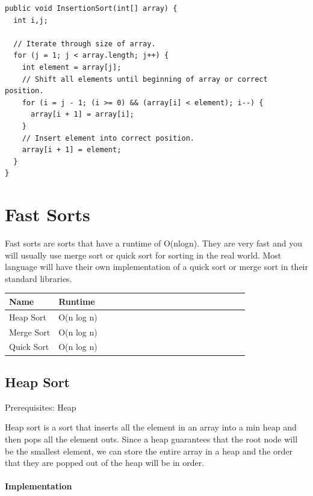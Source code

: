 \documentclass[11pt,oneside]{book}
\begin{document}
\begin{lstlisting}
public void InsertionSort(int[] array) {
  int i,j;

  // Iterate through size of array.
  for (j = 1; j < array.length; j++) {
    int element = array[j];
    // Shift all elements until beginning of array or correct position.
    for (i = j - 1; (i >= 0) && (array[i] < element); i--) {
      array[i + 1] = array[i];
    }
    // Insert element into correct position.
    array[i + 1] = element;
  }
}
\end{lstlisting}

    \chapter{ Fast Sorts }
        

Fast sorts are sorts that have a runtime of O(nlogn). They are very fast and you will usually use merge sort or quick sort for sorting in the real world. Most language will have their own implementation of a quick sort or merge sort in their standard libraries. 
\vspace{10px}\begin{tabulary}{0.4\linewidth}{|l|l|l|l|l|l|l|l|l|l|l|l|l|l|l|l|l|l|l}\hline


  Name &
  Runtime\\
\hline


  Heap Sort &
  O(n log n)\\

  Merge Sort &
  O(n log n)\\

  Quick Sort &
  O(n log n)\\

\hline\end{tabulary}


        \section{ Heap Sort }
        

Prerequisites: Heap

Heap sort is a sort that inserts all the element in an array into a min heap and then pops all the element outs. Since a heap guarantees that the root node will be the smallest element, we can store the entire array in a heap and the order that they are popped out of the heap will be in order.

\subsubsection{Implementation}
\end{document}
